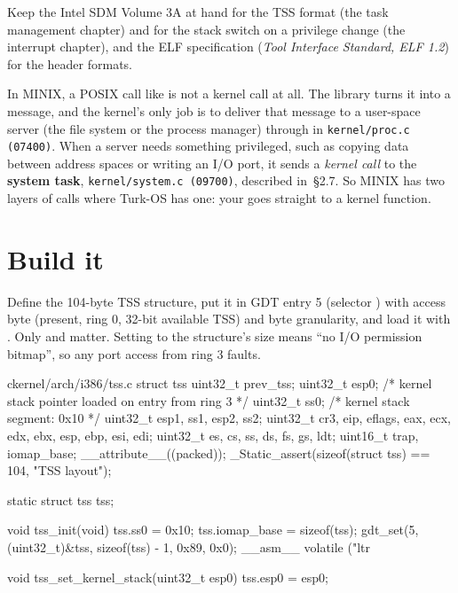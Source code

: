 \documentclass[11pt,a4paper]{article}
\begin{document}
Keep the Intel SDM Volume 3A at hand for the TSS format (the task management chapter) and for the stack switch on a
privilege change (the interrupt chapter), and the ELF specification (\emph{Tool Interface Standard, ELF 1.2}) for the
header formats.

\begin{minixbox}
In MINIX, a POSIX call like  is not a kernel call at all. The library turns it into a message, and the
kernel's only job is to deliver that message to a user-space server (the file system or the process manager) through
 in \texttt{kernel/proc.c (07400)}. When a server needs something privileged, such as copying data
between address spaces or writing an I/O port, it sends a \emph{kernel call} to the \textbf{system task},
\texttt{kernel/system.c (09700)}, described in \OSDI\,\S2.7. So MINIX has two layers of calls where Turk-OS has one:
your  goes straight to a kernel function.
\end{minixbox}

\section{Build it}

Define the 104-byte TSS structure, put it in GDT entry 5 (selector ) with access byte  (present,
ring 0, 32-bit available TSS) and byte granularity, and load it with . Only  and 
matter. Setting  to the structure's size means ``no I/O permission bitmap'', so any port access from
ring 3 faults.

\begin{lst}{c}{kernel/arch/i386/tss.c}
struct tss {
    uint32_t prev_tss;
    uint32_t esp0;              /* kernel stack pointer loaded on entry from ring 3 */
    uint32_t ss0;               /* kernel stack segment: 0x10                       */
    uint32_t esp1, ss1, esp2, ss2;
    uint32_t cr3, eip, eflags, eax, ecx, edx, ebx, esp, ebp, esi, edi;
    uint32_t es, cs, ss, ds, fs, gs, ldt;
    uint16_t trap, iomap_base;
} __attribute__((packed));
_Static_assert(sizeof(struct tss) == 104, "TSS layout");

static struct tss tss;

void tss_init(void)
{
    tss.ss0 = 0x10;
    tss.iomap_base = sizeof(tss);
    gdt_set(5, (uint32_t)&tss, sizeof(tss) - 1, 0x89, 0x0);
    __asm__ volatile ("ltr %
}

void tss_set_kernel_stack(uint32_t esp0) { tss.esp0 = esp0; }
\end{lst}
\end{document}

